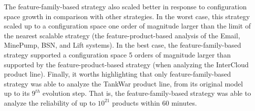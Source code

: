
The feature-family-based strategy also scaled better in response to
configuration space growth in comparison with other strategies.  In the worst
case, this strategy scaled up to a configuration space one order of magnitude
larger than the limit of the nearest scalable strategy (the
feature-product-based analysis of the Email, MinePump, BSN, and Lift systems).
In the best case, the feature-family-based strategy supported a configuration
space 5 orders of magnitude larger than supported by the feature-product-based
strategy (when analyzing the InterCloud product line).  Finally, it worths highlighting
that only feature-family-based strategy was able to analyze the TankWar
product line, from its original model up to its $9^{th}$ evolution step.  That
is, the feature-family-based strategy was able to analyze the reliability of up
to $10^{21}$ products within $60$ minutes. 


